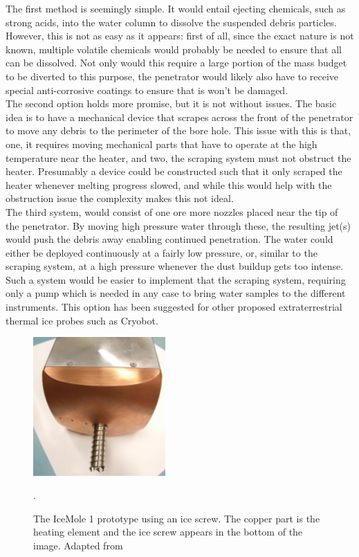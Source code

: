 \noindent
The first method is seemingly simple. It would entail ejecting chemicals, such as strong acids, into the water column to dissolve the suspended debris particles. However, this is not as easy as it appears: first of all, since the exact nature is not known, multiple volatile chemicals would probably be needed to ensure that all can be dissolved. Not only would this require a large portion of the mass budget to be diverted to this purpose, the penetrator would likely also have to receive special anti-corrosive coatings to ensure that is won't be damaged.\\

\noindent
The second option holds more promise, but it is not without issues. The basic idea is to have a mechanical device that scrapes across the front of the penetrator to move any debris to the perimeter of the bore hole. This issue with this is that, one, it requires moving mechanical parts that have to operate at the high temperature near the heater, and two, the scraping system must not obstruct the heater. Presumably a device could be constructed such that it only scraped the heater whenever melting progress slowed, and while this would help with the obstruction issue the complexity makes this not ideal.\\

\noindent
The third system, would consist of one ore more nozzles placed near the tip of the penetrator. By moving high pressure water through these, the resulting jet(s) would push the debris away enabling continued penetration. The water could either be deployed continuously at a fairly low pressure, or, similar to the scraping system, at a high pressure whenever the dust buildup gets too intense. Such a system would be easier to implement that the scraping system, requiring only a pump which is needed in any case to bring water samples to the different instruments. This option has been suggested for other proposed extraterrestrial thermal ice probes such as Cryobot\cite{article:zimmerman2001a}.\\

 \begin{figure}[ht]
 	\centering
 	\includegraphics[width=0.45\textwidth]{figures/LAMC/iceScrew}
 	\caption{The IceMole 1 prototype using an ice screw. The copper part is the heating element and the ice screw appears in the bottom of the image. Adapted from \cite{article:dachwald2014a}}.
 	\label{fig:iceScrew}
 \end{figure}   
 
